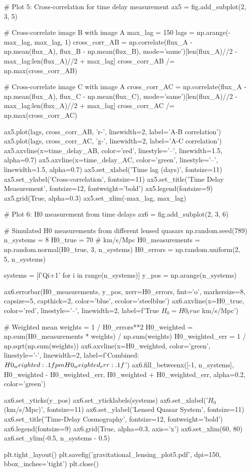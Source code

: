 \documentclass[11pt,a4paper]{article}
\begin{document}
\begin{pycode}
# Plot 5: Cross-correlation for time delay measurement
ax5 = fig.add_subplot(2, 3, 5)

# Cross-correlate image B with image A
max_lag = 150
lags = np.arange(-max_lag, max_lag, 1)
cross_corr_AB = np.correlate(flux_A - np.mean(flux_A), flux_B - np.mean(flux_B), mode='same')[len(flux_A)//2 - max_lag:len(flux_A)//2 + max_lag]
cross_corr_AB /= np.max(cross_corr_AB)

# Cross-correlate image C with image A
cross_corr_AC = np.correlate(flux_A - np.mean(flux_A), flux_C - np.mean(flux_C), mode='same')[len(flux_A)//2 - max_lag:len(flux_A)//2 + max_lag]
cross_corr_AC /= np.max(cross_corr_AC)

ax5.plot(lags, cross_corr_AB, 'r-', linewidth=2, label='A-B correlation')
ax5.plot(lags, cross_corr_AC, 'g-', linewidth=2, label='A-C correlation')
ax5.axvline(x=time_delay_AB, color='red', linestyle='--', linewidth=1.5, alpha=0.7)
ax5.axvline(x=time_delay_AC, color='green', linestyle='--', linewidth=1.5, alpha=0.7)
ax5.set_xlabel('Time lag (days)', fontsize=11)
ax5.set_ylabel('Cross-correlation', fontsize=11)
ax5.set_title('Time Delay Measurement', fontsize=12, fontweight='bold')
ax5.legend(fontsize=9)
ax5.grid(True, alpha=0.3)
ax5.set_xlim(-max_lag, max_lag)

# Plot 6: H0 measurement from time delays
ax6 = fig.add_subplot(2, 3, 6)

# Simulated H0 measurements from different lensed quasars
np.random.seed(789)
n_systems = 8
H0_true = 70  # km/s/Mpc
H0_measurements = np.random.normal(H0_true, 3, n_systems)
H0_errors = np.random.uniform(2, 5, n_systems)

systems = [f'Q{i+1}' for i in range(n_systems)]
y_pos = np.arange(n_systems)

ax6.errorbar(H0_measurements, y_pos, xerr=H0_errors, fmt='o', markersize=8,
            capsize=5, capthick=2, color='blue', ecolor='steelblue')
ax6.axvline(x=H0_true, color='red', linestyle='--', linewidth=2,
           label=f'True $H_0 = {H0_true}$ km/s/Mpc')

# Weighted mean
weights = 1 / H0_errors**2
H0_weighted = np.sum(H0_measurements * weights) / np.sum(weights)
H0_weighted_err = 1 / np.sqrt(np.sum(weights))
ax6.axvline(x=H0_weighted, color='green', linestyle='-', linewidth=2,
           label=f'Combined: ${H0_weighted:.1f} \\pm {H0_weighted_err:.1f}$')
ax6.fill_betweenx([-1, n_systems], H0_weighted - H0_weighted_err,
                 H0_weighted + H0_weighted_err, alpha=0.2, color='green')

ax6.set_yticks(y_pos)
ax6.set_yticklabels(systems)
ax6.set_xlabel('$H_0$ (km/s/Mpc)', fontsize=11)
ax6.set_ylabel('Lensed Quasar System', fontsize=11)
ax6.set_title('Time-Delay Cosmography', fontsize=12, fontweight='bold')
ax6.legend(fontsize=9)
ax6.grid(True, alpha=0.3, axis='x')
ax6.set_xlim(60, 80)
ax6.set_ylim(-0.5, n_systems - 0.5)

plt.tight_layout()
plt.savefig('gravitational_lensing_plot5.pdf', dpi=150, bbox_inches='tight')
plt.close()
\end{pycode}
\end{document}
